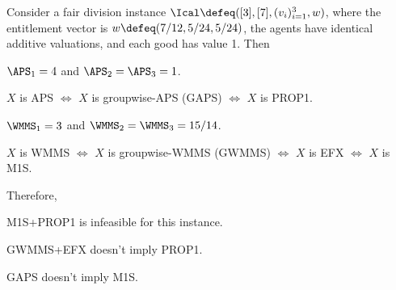 \begin{lemma}
\label{cex:prop1-plus-m1s-ue}
Consider a fair division instance $\Ical \defeq ([3], [7], (v_i)_{i=1}^3, w)$,
where the entitlement vector is $w \defeq (7/12, 5/24, 5/24)$,
the agents have identical additive valuations, and each good has value 1. Then
\begin{tightenum}
\item $\APS_1 = 4$ and $\APS_2 = \APS_3 = 1$.
\item $X$ is APS $\iff$ $X$ is groupwise-APS (GAPS) $\iff$ $X$ is PROP1.
\item $\WMMS_1 = 3$ and $\WMMS_2 = \WMMS_3 = 15/14$.
\item $X$ is WMMS $\iff$ $X$ is groupwise-WMMS (GWMMS) $\iff$ $X$ is EFX $\iff$ $X$ is M1S.
\end{tightenum}
Therefore,
\begin{tightenum}
\item M1S+PROP1 is infeasible for this instance.
\item GWMMS+EFX doesn't imply PROP1.
\item GAPS doesn't imply M1S.
\end{tightenum}
\end{lemma}
